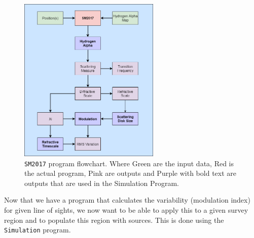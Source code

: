 \documentclass[a4paper]{article}
\begin{document}
\begin{figure}[H]
    \centering
    \includegraphics[width=0.6\textwidth]{SM2017.png}
    \caption{\texttt{SM2017} program flowchart. Where Green are the input data, Red is the actual program, Pink are outputs and Purple with bold text are outputs that are used in the Simulation Program.}
    \label{fig:SM}
\end{figure}

Now that we have a program that calculates the variability (modulation index) for given line of sights, we now want to be able to apply this to a given survey region and to populate this region with sources. This is done using the \texttt{Simulation} program.
\end{document}
